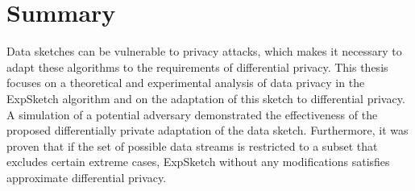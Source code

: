 \chapter*{Summary}

Data sketches can be vulnerable to privacy attacks, which makes it necessary to adapt these algorithms to the requirements of differential privacy. This thesis focuses on a theoretical and experimental analysis of data privacy in the ExpSketch algorithm and on the adaptation of this sketch to differential privacy. A simulation of a potential adversary demonstrated the effectiveness of the proposed differentially private adaptation of the data sketch. Furthermore, it was proven that if the set of possible data streams is restricted to a subset that excludes certain extreme cases, ExpSketch without any modifications satisfies approximate differential privacy.
